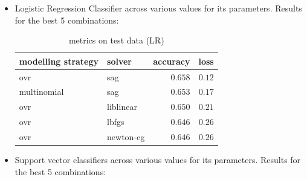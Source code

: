 \documentclass[fleqn,10pt]{SelfArx} %
\begin{document}
\begin{itemize}
\item Logistic Regression Classifier across various values for its parameters. Results for the best 5 combinations:
  \begin{table}[H]
    \caption{metrics on test data (LR)}
    \centering
    \begin{tabular}{llrr}
      \toprule
      modelling strategy & solver & accuracy & loss \\
      \midrule
      ovr & sag & $0.658$ & $0.12$ \\
      multinomial & sag & $0.653$ & $0.17$ \\
      ovr & liblinear & $0.650$ & $0.21$ \\
      ovr & lbfgs & $0.646$ & $0.26$ \\
      ovr & newton-cg & $0.646$ & $0.26$ \\
      \bottomrule
    \end{tabular}
  \end{table}

\item Support vector classifiers across various values for its parameters. Results for the best 5 combinations:


\end{itemize}
\end{document}
